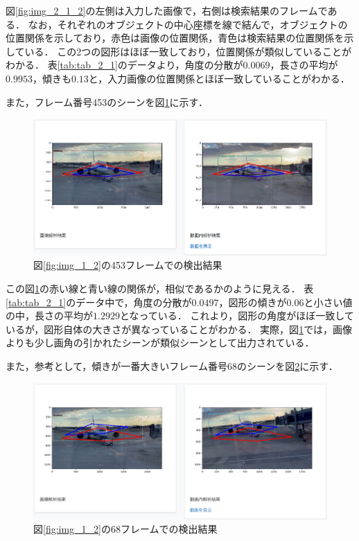 \documentclass[a4j,12pt,dvipdfmx]{jreport}
\begin{document}
図\ref{fig:img_2_1_2}の左側は入力した画像で，右側は検索結果のフレームである．
なお，それぞれのオブジェクトの中心座標を線で結んで，オブジェクトの位置関係を示しており，赤色は画像の位置関係，青色は検索結果の位置関係を示している．
この2つの図形はほぼ一致しており，位置関係が類似していることがわかる．
表\ref{tab:tab_2_1}のデータより，角度の分散が$0.0069$，長さの平均が$0.9953$，傾きも$0.13$と，入力画像の位置関係とほぼ一致していることがわかる．

また，フレーム番号453のシーンを図\ref{fig:img_2_1_3}に示す．

\begin{figure}[t]
  \centering
  \includegraphics[width=13cm]{image/result_2_1_3.jpg}
  \caption{図\ref{fig:img_1_2}の453フレームでの検出結果}
  \label{fig:img_2_1_3}
\end{figure}

この図\ref{fig:img_2_1_3}の赤い線と青い線の関係が，相似であるかのように見える．
表\ref{tab:tab_2_1}のデータ中で，角度の分散が$0.0497$，図形の傾きが$0.06$と小さい値の中，長さの平均が$1.2929$となっている．
これより，図形の角度がほぼ一致しているが，図形自体の大きさが異なっていることがわかる．
実際，図\ref{fig:img_2_1_3}では，画像よりも少し画角の引かれたシーンが類似シーンとして出力されている．

また，参考として，傾きが一番大きいフレーム番号68のシーンを図\ref{fig:img_2_1_4}に示す．
\begin{figure}[t]
  \centering
  \includegraphics[width=13cm]{image/result_2_1_4.jpg}
  \caption{図\ref{fig:img_1_2}の68フレームでの検出結果}
  \label{fig:img_2_1_4}
\end{figure}
\end{document}

